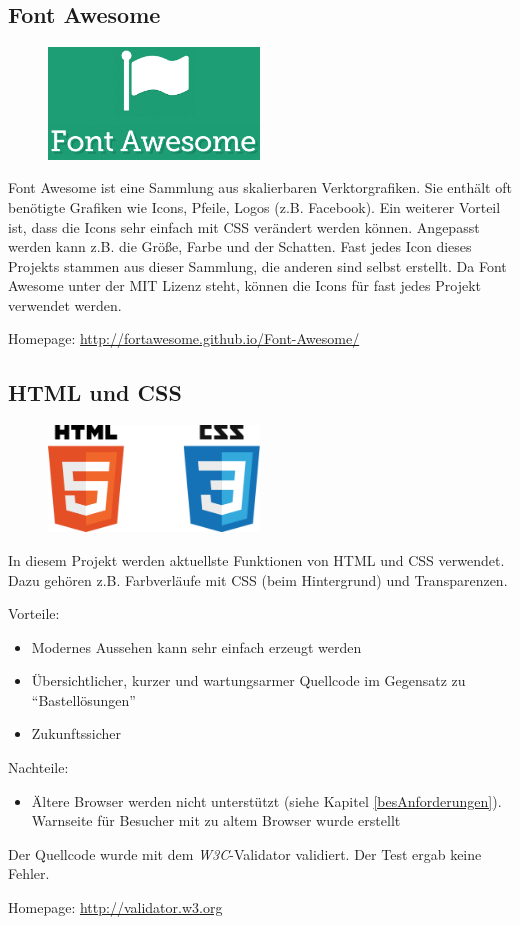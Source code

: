 \subsection{Font Awesome}
\begin{figure}[h]
  \centering
  \includegraphics[width=0.5\textwidth]{images/fontawesome_logo.png}
\end{figure}
Font Awesome ist eine Sammlung aus skalierbaren Verktorgrafiken. Sie enthält oft benötigte Grafiken wie Icons, Pfeile, Logos (z.B. Facebook). Ein weiterer Vorteil ist, dass die Icons sehr einfach mit CSS verändert werden können. Angepasst werden kann z.B. die Größe, Farbe und der Schatten. Fast jedes Icon dieses Projekts stammen aus dieser Sammlung, die anderen sind selbst erstellt. Da Font Awesome unter der MIT Lizenz steht, können die Icons für fast jedes Projekt verwendet werden.

Homepage: \url{http://fortawesome.github.io/Font-Awesome/}

\subsection{HTML und CSS}
\begin{figure}[h]
  \centering
  \includegraphics[width=0.5\textwidth]{images/html5_css_logo.pdf}
\end{figure}
In diesem Projekt werden aktuellste Funktionen von HTML und CSS verwendet. Dazu gehören z.B. Farbverläufe mit CSS (beim Hintergrund) und Transparenzen. 

Vorteile:
\begin{itemize}
	\item Modernes Aussehen kann sehr einfach erzeugt werden
	\item Übersichtlicher, kurzer und wartungsarmer Quellcode im Gegensatz zu ``Bastellösungen''
	\item Zukunftssicher
\end{itemize}
Nachteile:
\begin{itemize}
	\item Ältere Browser werden nicht unterstützt (siehe Kapitel \ref{besAnforderungen}). Warnseite für Besucher mit zu altem Browser wurde erstellt
\end{itemize}

Der Quellcode wurde mit dem \textit{W3C}-Validator validiert. Der Test ergab keine Fehler.

Homepage: \url{http://validator.w3.org}

